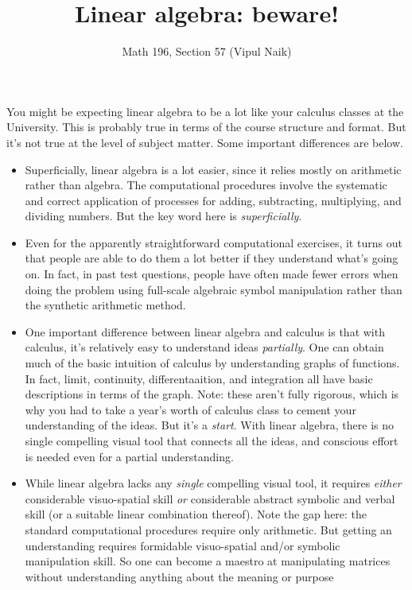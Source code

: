 \documentclass[10pt]{amsart}
\title{Linear algebra: beware!}
\author{Math 196, Section 57 (Vipul Naik)}
\begin{document}
\maketitle

You might be expecting linear algebra to be a lot like your calculus
classes at the University. This is probably true in terms of the
course structure and format. But it's not true at the level of subject
matter. Some important differences are below.

\begin{itemize}
\item Superficially, linear algebra is a lot easier, since it relies
  mostly on arithmetic rather than algebra. The computational
  procedures involve the systematic and correct application of
  processes for adding, subtracting, multiplying, and dividing
  numbers. But the key word here is {\em superficially}. 
\item Even for the apparently straightforward computational exercises,
  it turns out that people are able to do them a lot better if they
  understand what's going on. In fact, in past test questions, people
  have often made fewer errors when doing the problem using full-scale
  algebraic symbol manipulation rather than the synthetic arithmetic
  method.
\item One important difference between linear algebra and calculus is
  that with calculus, it's relatively easy to understand ideas {\em
    partially}. One can obtain much of the basic intuition of calculus
  by understanding graphs of functions. In fact, limit, continuity,
  differentaaition, and integration all have basic descriptions in
  terms of the graph. Note: these aren't fully rigorous, which is why
  you had to take a year's worth of calculus class to cement your
  understanding of the ideas. But it's a {\em start}. With linear
  algebra, there is no single compelling visual tool that connects all
  the ideas, and conscious effort is needed even for a partial
  understanding.
\item While linear algebra lacks any {\em single} compelling visual
  tool, it requires {\em either} considerable visuo-spatial skill {\em
    or} considerable abstract symbolic and verbal skill (or a suitable
  linear combination thereof). Note the gap here: the standard
  computational procedures require only arithmetic. But getting an
  understanding requires formidable visuo-spatial and/or symbolic
  manipulation skill. So one can become a maestro at manipulating
  matrices without understanding anything about the meaning or purpose

\end{itemize}
\end{document}
